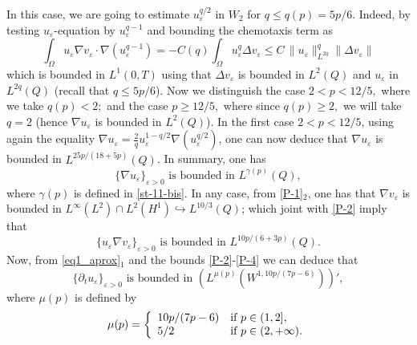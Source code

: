 \documentclass[11pt,reqno]{amsart}%
\numberwithin{equation}{section}
\begin{document}
{In this case, we are going to estimate $u_\varepsilon^{q/2}$ in $W_2$ for $q\le q(p)=5p/6$. Indeed, by testing $u_\varepsilon$-equation by $u_\varepsilon^{q-1}$ and bounding the chemotaxis term as 
$$
\int_\Omega u_\varepsilon\nabla v_\varepsilon\cdot \nabla (u_\varepsilon^{q-1})
=- C(q) \int_\Omega u_\varepsilon^q\Delta v_\varepsilon
\le  C\, \|u_\varepsilon\|_{L^{2q}}^q \|\Delta v_\varepsilon\|
$$
which is bounded in $L^1(0,T)$ using that $\Delta v_\varepsilon$ is bounded in $L^2(Q)$ and $u_\varepsilon$ in $L^{2q}(Q)$ (recall that $q\le 5p/6$). Now we distinguish the case $2<p<12/5,$ where we take $q(p)<2;$ and the case $p\ge 12/5,$ where since $q(p)\ge 2,$ we will take  $q=2$ (hence $\nabla u_\varepsilon$ is bounded in $L^2(Q)$).  In the first case $2<p<12/5$,  using again the equality $\nabla u_\varepsilon=\frac2q u_\varepsilon^{1-q/2}\nabla(u_\varepsilon^{q/2})$, one can now deduce that $\nabla u_\varepsilon$ is bounded in $L^{25p/(18+5p)}(Q)$. In summary, 
one has
\begin{equation}\label{P-3}
\{\nabla u_\varepsilon\}_{\varepsilon>0}\mbox{ is bounded in }L^{\gamma(p)}(Q),
\end{equation}
where $\gamma(p)$ is defined in \eqref{st-11-bis}. In any case, from \eqref{P-1}$_2$, one has that $\nabla v_\varepsilon$ is bounded in $L^\infty(L^2)\cap L^2(H^1)\hookrightarrow L^{10/3}(Q)$; which joint with \eqref{P-2} imply that
\begin{equation}\label{P-4}
\{u_\varepsilon\nabla v_\varepsilon\}_{\varepsilon>0}\mbox{ is bounded in }L^{10p/(6+3p)}(Q).
\end{equation}
Now, from \eqref{eq1_aprox}$_1$ and the bounds \eqref{P-2}-\eqref{P-4} we can deduce that 
\begin{equation}\label{P-5}
\{\partial_tu_\varepsilon\}_{\varepsilon>0}\mbox{ is bounded in }
(L^{\mu(p)}(W^{1,10p/(7p-6)}))',
\end{equation}
where $\mu(p)$ is defined by
\begin{equation} \label{mu(p)}
\mu(p)=
\left\{ 
\begin{array}{ll}
10p/(7p-6) & \hbox{if $p\in (1,2]$,}\\
 5/2 & \hbox{if $p\in (2,+\infty)$.}
\end{array}
\right.
\end{equation} 
 
}
\end{document}
